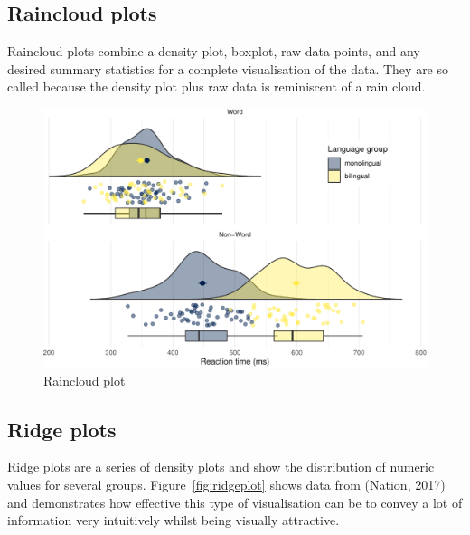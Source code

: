 \documentclass[
  english,
  doc,floatsintext]{apa6}
\begin{document}
\hypertarget{raincloud-plots}{%
\subsection{Raincloud plots}\label{raincloud-plots}}

Raincloud plots combine a density plot, boxplot, raw data points, and any desired summary statistics for a complete visualisation of the data. They are so called because the density plot plus raw data is reminiscent of a rain cloud.

\begin{figure}

{\centering \includegraphics[width=1\linewidth]{images/raincloud-1} 

}

\caption{Raincloud plot}\label{fig:raincloud}
\end{figure}

\hypertarget{ridge-plots}{%
\subsection{Ridge plots}\label{ridge-plots}}

Ridge plots are a series of density plots and show the distribution of numeric values for several groups. Figure~\ref{fig:ridgeplot} shows data from (Nation, 2017) and demonstrates how effective this type of visualisation can be to convey a lot of information very intuitively whilst being visually attractive.
\end{document}
